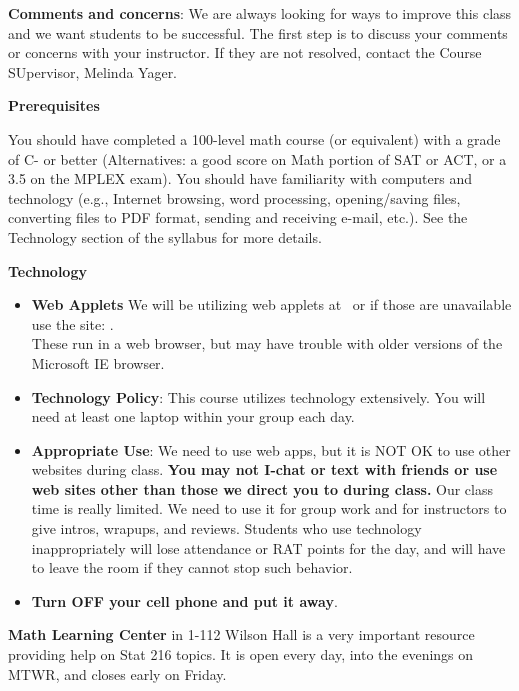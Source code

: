 {\bf Comments and concerns}: We are always looking for ways to improve
this class and we want students to be successful.  The first step is
to discuss your comments or concerns with your instructor.  If they
are not resolved, contact the Course SUpervisor, Melinda Yager. 


\newpage
 
{\bf Prerequisites }
 
You should have completed  a 100-level math course (or equivalent) with
a grade of C- or better (Alternatives: a good score on Math portion
of SAT or ACT, or a 3.5 on the MPLEX exam).   
 You should have familiarity with computers and technology (e.g.,
Internet browsing, word processing, opening/saving files, converting
files to PDF format, sending and receiving e-mail, etc.). See the
Technology section of the syllabus for more details.  
 


{\bf Technology} \vspace{-.3in}
\begin{itemize}
\item {\bf Web Applets}  We will be utilizing web applets 
 at \webAppURLFrst\ or
 if those are unavailable use the site: \webAppURLScnd.\\
  These run in a web browser, but
  may have trouble with older versions of the Microsoft IE browser.
\item {\bf Technology Policy}:  This course utilizes technology
  extensively.  You will need at least one laptop within your group each
  day.
\item {\bf Appropriate Use}: We need to use web apps, but it is NOT OK
  to use other websites during class. {\bf You may not I-chat or text
    with friends or  use web sites other than those we direct you to
    during class.} Our class time is really limited. We need to use it
  for group work and for instructors to give intros, wrapups, and
  reviews.  Students who use technology inappropriately will lose
  attendance or RAT points for the day, and will have to  leave the
  room if they cannot stop such behavior.
\item {\bf Turn OFF your cell phone and put it away}.
\end{itemize}

{\bf Math Learning Center} in 1-112 Wilson Hall is a very important
resource providing  help on Stat 216 topics.
 It is open every day, into the evenings on MTWR, and closes early on
 Friday. 


